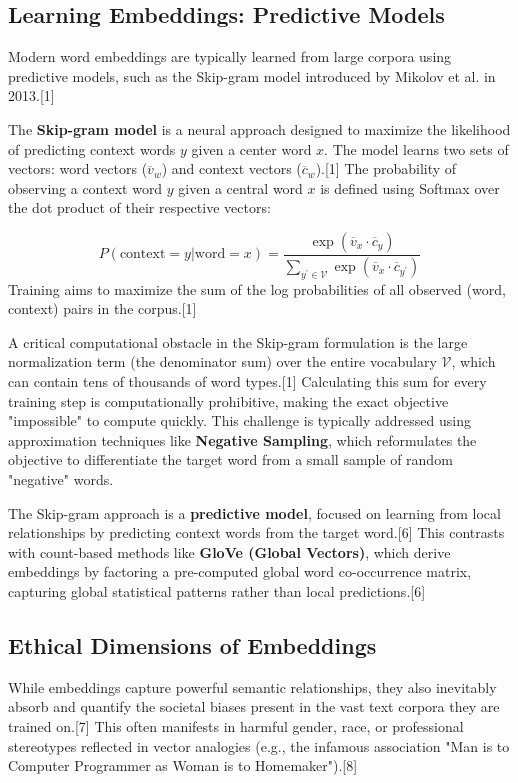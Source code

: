 \documentclass{article}
\begin{document}
\subsection{Learning Embeddings: Predictive Models}

Modern word embeddings are typically learned from large corpora using predictive models, such as the Skip-gram model introduced by Mikolov et al. in 2013.[1]

The \textbf{Skip-gram model} is a neural approach designed to maximize the likelihood of predicting context words $y$ given a center word $x$. The model learns two sets of vectors: word vectors ($\overline{v}_w$) and context vectors ($\overline{c}_w$).[1] The probability of observing a context word $y$ given a central word $x$ is defined using Softmax over the dot product of their respective vectors:

$$P(\text{context}=y|\text{word}=x)=\frac{\exp(\overline{v}_{x}\cdot\overline{c}_{y})}{\sum_{y^{\prime}\in\mathcal{V}}\exp(\overline{v}_{x}\cdot\overline{c}_{y^{\prime}})}$$
Training aims to maximize the sum of the log probabilities of all observed (word, context) pairs in the corpus.[1]

A critical computational obstacle in the Skip-gram formulation is the large normalization term (the denominator sum) over the entire vocabulary $\mathcal{V}$, which can contain tens of thousands of word types.[1] Calculating this sum for every training step is computationally prohibitive, making the exact objective "impossible" to compute quickly. This challenge is typically addressed using approximation techniques like \textbf{Negative Sampling}, which reformulates the objective to differentiate the target word from a small sample of random "negative" words.

The Skip-gram approach is a \textbf{predictive model}, focused on learning from local relationships by predicting context words from the target word.[6] This contrasts with count-based methods like \textbf{GloVe (Global Vectors)}, which derive embeddings by factoring a pre-computed global word co-occurrence matrix, capturing global statistical patterns rather than local predictions.[6]

\subsection{Ethical Dimensions of Embeddings}

While embeddings capture powerful semantic relationships, they also inevitably absorb and quantify the societal biases present in the vast text corpora they are trained on.[7] This often manifests in harmful gender, race, or professional stereotypes reflected in vector analogies (e.g., the infamous association "Man is to Computer Programmer as Woman is to Homemaker").[8]
\end{document}
